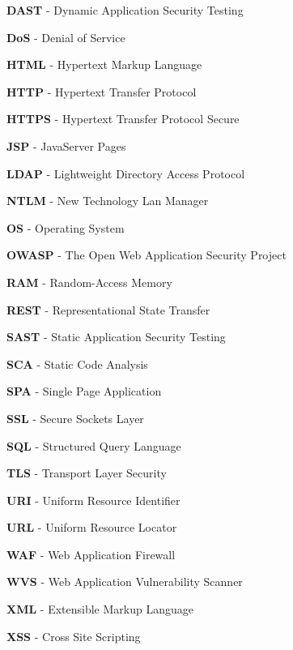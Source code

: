\documentclass[12pt,oneside,a4paper,parskip]{scrbook}
\begin{document}
  \textbf{DAST} - Dynamic Application Security Testing

  \textbf{DoS} - Denial of Service

  \textbf{HTML} - Hypertext Markup Language

  \textbf{HTTP} - Hypertext Transfer Protocol

  \textbf{HTTPS} - Hypertext Transfer Protocol Secure

  \textbf{JSP} - JavaServer Pages

  \textbf{LDAP} - Lightweight Directory Access Protocol

  \textbf{NTLM} - New Technology Lan Manager

  \textbf{OS} - Operating System

  \textbf{OWASP} - The Open Web Application Security Project

  \textbf{RAM} - Random-Access Memory

  \textbf{REST} - Representational State Transfer

  \textbf{SAST} - Static Application Security Testing

  \textbf{SCA} - Static Code Analysis

  \textbf{SPA} - Single Page Application

  \textbf{SSL} - Secure Sockets Layer

  \textbf{SQL} - Structured Query Language

  \textbf{TLS} - Transport Layer Security

  \textbf{URI} - Uniform Resource Identifier

  \textbf{URL} - Uniform Resource Locator

  \textbf{WAF} - Web Application Firewall

  \textbf{WVS} - Web Application Vulnerability Scanner

  \textbf{XML} - Extensible Markup Language

  \textbf{XSS} - Cross Site Scripting
  \newpage
\end{document}
